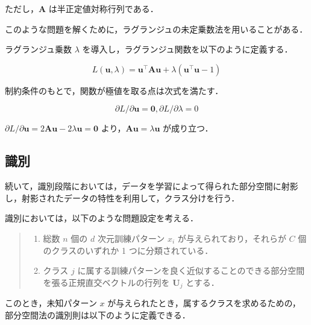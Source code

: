 \documentclass[fleqn, a4paper. 12pt]{jsarticle}
\begin{document}
        ただし，$\mathbf{A}$ は半正定値対称行列である．

        \quad

        このような問題を解くために，ラグランジュの未定乗数法を用いることがある．

        ラグランジュ乗数 $\lambda$ を導入し，ラグランジュ関数を以下のように定義する．

        \begin{equation}
            L(\boldsymbol{u}, \lambda)=\boldsymbol{u}^{\top} \mathbf{A} \boldsymbol{u}+\lambda\left(\boldsymbol{u}^{\top} \boldsymbol{u}-1\right)
        \end{equation}

        制約条件のもとで，関数が極値を取る点は次式を満たす．

        \begin{equation}
            \partial L / \partial \boldsymbol{u}=\mathbf{0}, \partial L / \partial \lambda=0
        \end{equation}

        $\partial L / \partial \boldsymbol{u}=2 \mathbf{A} \boldsymbol{u}-2 \lambda \boldsymbol{u}=\mathbf{0}$
        より，$\mathbf{A} \boldsymbol{u}=\lambda \boldsymbol{u}$ が成り立つ．

    \subsection{識別}

        続いて，識別段階においては，データを学習によって得られた部分空間に射影し，射影されたデータの特性を利用して，クラス分けを行う．

        \quad

        識別においては，以下のような問題設定を考える．

        \begin{quote}
            \begin{enumerate}
                \item 総数 $n$ 個の $d$ 次元訓練パターン $x_i$ が与えられており，それらが $C$ 個のクラスのいずれか 1 つに分類されている．
                \item クラス $j$ に属する訓練パターンを良く近似することのできる部分空間を張る正規直交ベクトルの行列を $\mathbf{U}_j$ とする．
            \end{enumerate}
        \end{quote}

        このとき，未知パターン $x$ が与えられたとき，属するクラスを求めるための，部分空間法の識別則は以下のように定義できる．
\end{document}
